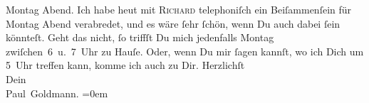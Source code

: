 \begin{ledgroupsized}[t]{13cm}
                  Montag{ }Abend. Ich habe heut mit \textsc{Richard} telephoniſch ein Beiſammenſein für Montag{ }Abend verabredet, und es wäre ſehr ſchön, wenn Du auch dabei ſein
               könnteſt. Geht das nicht, ſo triffſt Du mich jedenfalls Montag{ }zwiſchen 6 u. 7 Uhr{ }zu Hauſe. Oder, wenn Du mir
               ſagen kannſt, wo ich Dich um 5 Uhr treffen kann, komme ich auch zu
               Dir.\pend
           \pstart
           Herzlichſt {\\[\baselineskip]}Dein {\\[\baselineskip]}\spacefill\mbox{Paul Goldmann.}\pend
           \leftskip=0em{}
         
         \endnumbering{}\end{ledgroupsized}\begin{anhang}\end{anhang}\newcommand{\dateiname}{L03456}\newcommand{\titel}{Paul Goldmann an Arthur Schnitzler, 18. 11. [1904]}\newcommand{\editorInnen}{Martin Anton Müller und Laura Untner}
      